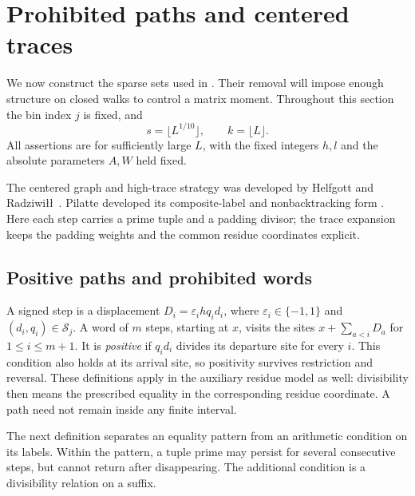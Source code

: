 \section{Prohibited paths and centered traces}\label{q:paths-trace}

We now construct the sparse sets used in .  Their
removal will impose enough structure on closed walks to control a
matrix moment.  Throughout this section the bin index $j$ is fixed,
and
\[
 s=\lfloor L^{1/10}\rfloor,\qquad k=\lfloor L\rfloor.
\]
All assertions are for sufficiently large $L$, with the fixed integers
$h,l$ and the absolute parameters $A,W$ held fixed.

The centered graph and high-trace strategy was developed by Helfgott
and Radziwi\l\l\ \cite[Sections~2--7]{HR21}.
Pilatte developed its composite-label and nonbacktracking form
\cite[Sections~2--9]{Pilatte26}.  Here each step carries a prime tuple
and a padding divisor; the trace expansion keeps the padding weights
and the common residue coordinates explicit.

\subsection{Positive paths and prohibited words}

A signed step is a displacement
$D_i=\varepsilon_i hq_i d_i$, where $\varepsilon_i\in\{-1,1\}$
and $(d_i,q_i)\in\mathcal S_j$.
A word of $m$ steps, starting at $x$, visits the sites
$x+\sum_{a<i}D_a$ for $1\le i\le m+1$.
It is \emph{positive} if $q_id_i$ divides its departure site for
every $i$.  This condition also holds at its arrival site, so
positivity survives restriction and reversal.  These definitions
apply in the auxiliary residue model as well: divisibility then means
the prescribed equality in the corresponding residue coordinate.
A path need not remain inside any finite interval.

The next definition separates an equality pattern from an arithmetic
condition on its labels.  Within the pattern, a tuple prime may persist for
several consecutive steps, but cannot return after disappearing.
The additional condition is a divisibility relation on a suffix.

